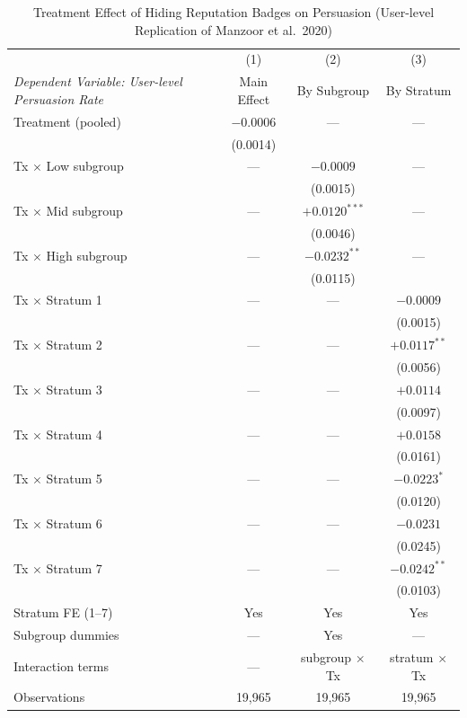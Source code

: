 \begin{table}[htbp]
\centering
\caption{Treatment Effect of Hiding Reputation Badges on Persuasion (User-level Replication of Manzoor et al.\ 2020)}
\label{tab:h1_treatment_effect}
\begin{threeparttable}
\begin{tabular}{lccc}
\toprule
 & (1) & (2) & (3) \\
\textit{Dependent Variable: User-level Persuasion Rate} & Main Effect & By Subgroup & By Stratum \\
\midrule
Treatment (pooled) & $-0.0006$ & --- & --- \\
 & (0.0014) &  &  \\
Tx $\times$ Low subgroup & --- & $-0.0009$ & --- \\
 &  & (0.0015) &  \\
Tx $\times$ Mid subgroup & --- & $+0.0120^{***}$ & --- \\
 &  & (0.0046) &  \\
Tx $\times$ High subgroup & --- & $-0.0232^{**}$ & --- \\
 &  & (0.0115) &  \\
Tx $\times$ Stratum 1 & --- & --- & $-0.0009$ \\
 &  &  & (0.0015) \\
Tx $\times$ Stratum 2 & --- & --- & $+0.0117^{**}$ \\
 &  &  & (0.0056) \\
Tx $\times$ Stratum 3 & --- & --- & $+0.0114$ \\
 &  &  & (0.0097) \\
Tx $\times$ Stratum 4 & --- & --- & $+0.0158$ \\
 &  &  & (0.0161) \\
Tx $\times$ Stratum 5 & --- & --- & $-0.0223^{*}$ \\
 &  &  & (0.0120) \\
Tx $\times$ Stratum 6 & --- & --- & $-0.0231$ \\
 &  &  & (0.0245) \\
Tx $\times$ Stratum 7 & --- & --- & $-0.0242^{**}$ \\
 &  &  & (0.0103) \\
\midrule
Stratum FE (1--7)   & Yes         & Yes & Yes \\
Subgroup dummies    & ---         & Yes & --- \\
Interaction terms   & ---         & subgroup $\times$ Tx & stratum $\times$ Tx \\
Observations         & 19,965 & 19,965 & 19,965 \\

\end{tabular}
\end{threeparttable}
\end{table}
